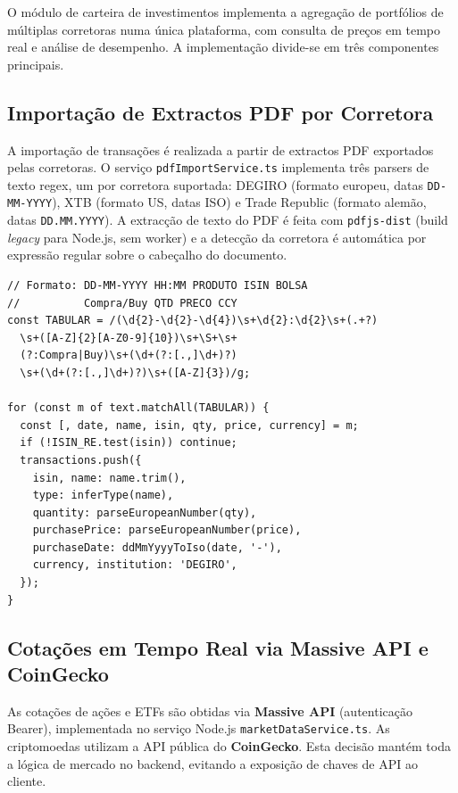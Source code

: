 O módulo de carteira de investimentos implementa a agregação de portfólios de múltiplas corretoras numa única plataforma, com consulta de preços em tempo real e análise de desempenho. A implementação divide-se em três componentes principais.

\subsection{Importação de Extractos PDF por Corretora}
\label{sec:impl-invest-import}

A importação de transações é realizada a partir de extractos PDF exportados pelas corretoras. O serviço \texttt{pdfImportService.ts} implementa três parsers de texto regex, um por corretora suportada: DEGIRO (formato europeu, datas \texttt{DD-MM-YYYY}), XTB (formato US, datas ISO) e Trade Republic (formato alemão, datas \texttt{DD.MM.YYYY}). A extracção de texto do PDF é feita com \texttt{pdfjs-dist} (build \textit{legacy} para Node.js, sem worker) e a detecção da corretora é automática por expressão regular sobre o cabeçalho do documento.

\begin{lstlisting}[caption={Parser DEGIRO --- regex de formato tabular (pdfImportService.ts).},label={lst:pdf-parser}]
// Formato: DD-MM-YYYY HH:MM PRODUTO ISIN BOLSA
//          Compra/Buy QTD PRECO CCY
const TABULAR = /(\d{2}-\d{2}-\d{4})\s+\d{2}:\d{2}\s+(.+?)
  \s+([A-Z]{2}[A-Z0-9]{10})\s+\S+\s+
  (?:Compra|Buy)\s+(\d+(?:[.,]\d+)?)
  \s+(\d+(?:[.,]\d+)?)\s+([A-Z]{3})/g;

for (const m of text.matchAll(TABULAR)) {
  const [, date, name, isin, qty, price, currency] = m;
  if (!ISIN_RE.test(isin)) continue;
  transactions.push({
    isin, name: name.trim(),
    type: inferType(name),
    quantity: parseEuropeanNumber(qty),
    purchasePrice: parseEuropeanNumber(price),
    purchaseDate: ddMmYyyyToIso(date, '-'),
    currency, institution: 'DEGIRO',
  });
}
\end{lstlisting}

\subsection{Cotações em Tempo Real via Massive API e CoinGecko}
\label{sec:impl-invest-prices}

As cotações de ações e ETFs são obtidas via \textbf{Massive API} (autenticação Bearer), implementada no serviço Node.js \texttt{marketDataService.ts}. As criptomoedas utilizam a API pública do \textbf{CoinGecko}. Esta decisão mantém toda a lógica de mercado no backend, evitando a exposição de chaves de API ao cliente.

